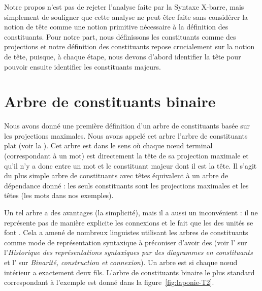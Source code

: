 {    Notre propos n’est pas de rejeter l’analyse faite par la Syntaxe X-barre, mais simplement de souligner que cette analyse ne peut être faite sans considérer la notion de tête comme une notion primitive nécessaire à la définition des constituants. Pour notre part, nous définissons les constituants comme des projections et notre définition des constituants repose crucialement sur la notion de tête, puisque, à chaque étape, nous devons d’abord identifier la tête pour pouvoir ensuite identifier les constituants majeurs.
}
\section{Arbre de constituants binaire}\label{sec:3.4.14}

Nous avons donné une première définition d’un arbre de constituants basée sur les projections maximales. Nous avons appelé cet arbre l’arbre de constituants plat (voir la ). Cet arbre est  dans le sens où chaque nœud terminal (correspondant à un mot) est directement la tête de sa projection maximale et qu’il n’y a donc  entre un mot et le constituant majeur dont il est la tête. Il s’agit du plus simple arbre de constituants avec têtes équivalent à un arbre de dépendance donné : les seuls constituants sont les projections maximales et les têtes (les mots dans nos exemples).

\begin{sloppypar}
Un tel arbre a des avantages (la simplicité), mais il a aussi un inconvénient : il ne représente pas de manière explicite les connexions et le fait que les  des unités se font . Cela a amené de nombreux linguistes utilisant les arbres de constituants comme mode de représentation syntaxique à préconiser d’avoir des  (voir l' sur l’\textit{Historique des représentations syntaxiques par des diagrammes en constituants} et l' sur \textit{Binarité, construction et connexion}). Un arbre est  si chaque nœud intérieur a exactement deux fils. L’arbre de constituants binaire le plus standard correspondant à l'exemple  est donné dans la figure~\ref{fig:laponie-T2}.
\end{sloppypar}

